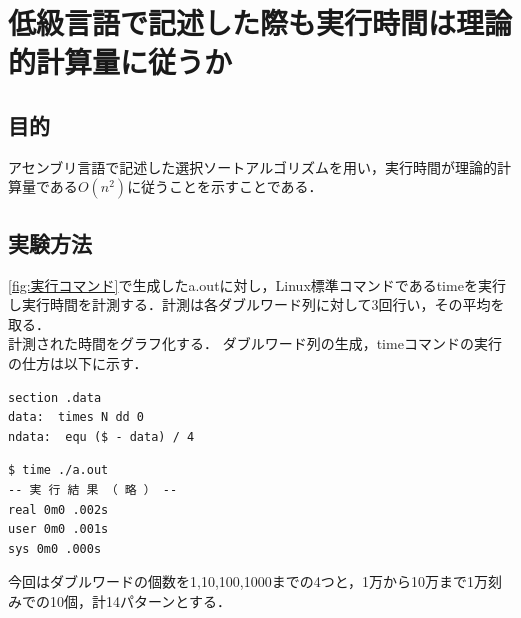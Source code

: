 \chapter{低級言語で記述した際も実行時間は理論的計算量に従うか}
\section{目的}
アセンブリ言語で記述した選択ソートアルゴリズムを用い，実行時間が理論的計算量である$O(n^2)$に従うことを示すことである．

\section{実験方法}
\ref{fig:実行コマンド}で生成したa.outに対し，Linux標準コマンドであるtimeを実行し実行時間を計測する．計測は各ダブルワード列に対して3回行い，その平均を取る．\\
計測された時間をグラフ化する．
ダブルワード列の生成，timeコマンドの実行の仕方は以下に示す．
\begin{lstlisting}[numbers={none}, caption={ダブルワード列の生成（N=データ数)}]
    section .data
data:  times N dd 0
ndata:  equ ($ - data) / 4
\end{lstlisting}
\begin{lstlisting}[numbers={none}, caption={timeの実行(realが実行時間)}]
$ time ./a.out
-- 実 行 結 果 （ 略 ） --
real 0m0 .002s
user 0m0 .001s
sys 0m0 .000s
\end{lstlisting}
今回はダブルワードの個数を1,10,100,1000までの4つと，1万から10万まで1万刻みでの10個，計14パターンとする．

\clearpage

